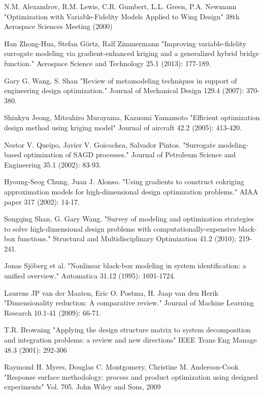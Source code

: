 \documentclass[a4paper,onecolumn]{article}
\theoremstyle{remark}
\begin{document}
\begin{thebibliography}{9}
N.M. Alexandrov, R.M. Lewis, C.R. Gumbert, L.L. Green, P.A. Newmann
"Optimization with Variable-Fidelity Models Applied to Wing Design"
38th Aerospace Sciences Meeting (2000)

Han Zhong-Hua, Stefan Görtz, Ralf Zimmermann
"Improving variable-fidelity surrogate modeling via gradient-enhanced kriging and a generalized hybrid bridge function."
Aerospace Science and Technology 25.1 (2013): 177-189.

Gary G. Wang, S. Shan
"Review of metamodeling techniques in support of engineering design optimization."
Journal of Mechanical Design 129.4 (2007): 370-380.

Shinkyu Jeong, Mitsuhiro Murayama, Kazuomi Yamamoto
"Efficient optimization design method using kriging model" 
Journal of aircraft 42.2 (2005): 413-420.

Nestor V. Queipo, Javier V. Goicochea, Salvador Pintos. 
"Surrogate modeling-based optimization of SAGD processes." 
Journal of Petroleum Science and Engineering 35.1 (2002): 83-93.

Hyoung-Seog Chung, Juan J. Alonso. 
"Using gradients to construct cokriging approximation models for high-dimensional design optimization problems." 
AIAA paper 317 (2002): 14-17.

Songqing Shan, G. Gary Wang. 
"Survey of modeling and optimization strategies to solve high-dimensional design problems with computationally-expensive black-box functions." 
Structural and Multidisciplinary Optimization 41.2 (2010): 219-241.

Jonas Sjöberg et al.
"Nonlinear black-box modeling in system identification: a unified overview." 
Automatica 31.12 (1995): 1691-1724.

Laurens JP van der Maaten, Eric O. Postma, H. Jaap van den Herik
"Dimensionality reduction: A comparative review." 
Journal of Machine Learning Research 10.1-41 (2009): 66-71.

T.R. Browning
"Applying the design structure matrix to system decomposition and integration problems: a review
 and new directions"
IEEE Trans Eng Manage 48.3 (2001): 292-306

Raymond H. Myers, Douglas C. Montgomery, Christine M. Anderson-Cook
"Response surface methodology: process and product optimization using designed experiments"
Vol. 705. John Wiley and Sons, 2009


\end{thebibliography}
\end{document}

